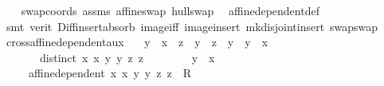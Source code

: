 \begin{isabellebody}
%
\isadelimproof
\ \ %
\endisadelimproof
%
\isatagproof
{}\isamarkupfalse%
\ swap{\isacharunderscore}{\kern0pt}coords\ assms\ affine{\isacharunderscore}{\kern0pt}swap\ hull{\isacharunderscore}{\kern0pt}swap\ \isamarkupfalse%
\ affine{\isacharunderscore}{\kern0pt}dependent{\isacharunderscore}{\kern0pt}def\isanewline
\ \ \isamarkupfalse%
\ {\isacharparenleft}{\kern0pt}smt\ {\isacharparenleft}{\kern0pt}verit{\isacharparenright}{\kern0pt}\ Diff{\isacharunderscore}{\kern0pt}insert{\isacharunderscore}{\kern0pt}absorb\ image{\isacharunderscore}{\kern0pt}iff\ image{\isacharunderscore}{\kern0pt}insert\ mk{\isacharunderscore}{\kern0pt}disjoint{\isacharunderscore}{\kern0pt}insert\ swap{\isacharunderscore}{\kern0pt}swap{\isacharparenright}{\kern0pt}%
\endisatagproof
{\isafoldproof}%
%
\isadelimproof
\isanewline
%
\endisadelimproof
\isanewline
{}\isamarkupfalse%
\ cross{\isacharunderscore}{\kern0pt}affine{\isacharunderscore}{\kern0pt}dependent{\isacharunderscore}{\kern0pt}aux{}{\isacharcolon}{\kern0pt}\isanewline
\ \ \ {\isachardoublequoteopen}{\isacharparenleft}{\kern0pt}y{}\ {\isacharminus}{\kern0pt}\ x{}{\isacharparenright}{\kern0pt}\ {\isacharasterisk}{\kern0pt}\ {\isacharparenleft}{\kern0pt}z{}\ {\isacharminus}{\kern0pt}\ y{}{\isacharparenright}{\kern0pt}\ {\isacharminus}{\kern0pt}\ {\isacharparenleft}{\kern0pt}z{}\ {\isacharminus}{\kern0pt}\ y{}{\isacharparenright}{\kern0pt}\ {\isacharasterisk}{\kern0pt}\ {\isacharparenleft}{\kern0pt}y{}\ {\isacharminus}{\kern0pt}\ x{}{\isacharparenright}{\kern0pt}\ {\isacharequal}{\kern0pt}\ {}{\isachardoublequoteclose}\ \isanewline
\ \ \ \ \ \ \ {\isachardoublequoteopen}distinct\ {\isacharbrackleft}{\kern0pt}{\isacharparenleft}{\kern0pt}x{}{\isacharcomma}{\kern0pt}\ x{}{\isacharparenright}{\kern0pt}{\isacharcomma}{\kern0pt}\ {\isacharparenleft}{\kern0pt}y{}{\isacharcomma}{\kern0pt}\ y{}{\isacharparenright}{\kern0pt}{\isacharcomma}{\kern0pt}\ {\isacharparenleft}{\kern0pt}z{}{\isacharcomma}{\kern0pt}\ z{}{\isacharparenright}{\kern0pt}{\isacharbrackright}{\kern0pt}{\isachardoublequoteclose}\ \isanewline
\ \ \ \ \ \ \ {\isachardoublequoteopen}y{}\ {\isacharequal}{\kern0pt}\ x{}{\isachardoublequoteclose}\isanewline
\ \ \ \ \ {\isachardoublequoteopen}affine{\isacharunderscore}{\kern0pt}dependent\ {\isacharbraceleft}{\kern0pt}{\isacharparenleft}{\kern0pt}x{}{\isacharcomma}{\kern0pt}\ x{}{\isacharparenright}{\kern0pt}{\isacharcomma}{\kern0pt}\ {\isacharparenleft}{\kern0pt}y{}{\isacharcomma}{\kern0pt}\ y{}{\isacharparenright}{\kern0pt}{\isacharcomma}{\kern0pt}\ {\isacharparenleft}{\kern0pt}z{}{\isacharcomma}{\kern0pt}\ z{}{\isacharparenright}{\kern0pt}\ {\isacharcolon}{\kern0pt}{\isacharcolon}{\kern0pt}\ R{}{\isacharbraceright}{\kern0pt}{\isachardoublequoteclose}\isanewline

\end{isabellebody}
